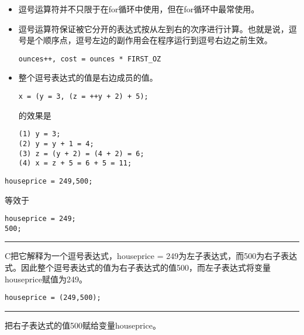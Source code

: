 \begin{frame}[fragile]\ft{\secname}
\begin{itemize}
\item
 逗号运算符并不只限于在for循环中使用，但在for循环中最常使用。
\end{itemize}
\end{frame}


\begin{frame}[fragile]\ft{\secname}
\begin{itemize}
\item
逗号运算符保证被它分开的表达式按从左到右的次序进行计算。也就是说，逗号是个顺序点，逗号左边的副作用会在程序运行到逗号右边之前生效。
\begin{lstlisting}
ounces++, cost = ounces * FIRST_OZ
\end{lstlisting}
\end{itemize}

\end{frame}

\begin{frame}[fragile]\ft{\secname}
\begin{itemize}
\item
整个逗号表达式的值是右边成员的值。
\begin{lstlisting}
x = (y = 3, (z = ++y + 2) + 5);
\end{lstlisting}
的效果是
\begin{lstlisting}
(1) y = 3;
(2) y = y + 1 = 4;
(3) z = (y + 2) = (4 + 2) = 6;
(4) x = z + 5 = 6 + 5 = 11;
\end{lstlisting}
\end{itemize}

\end{frame}

\begin{frame}[fragile]\ft{\secname}
\begin{lstlisting}
houseprice = 249,500;
\end{lstlisting}
等效于
\begin{lstlisting}
houseprice = 249;
500;
\end{lstlisting}
\rule{\textwidth}{1mm}\pause\vspace{0.1in}

C把它解释为一个逗号表达式，houseprice = 249为左子表达式，而500为右子表达式。因此整个逗号表达式的值为右子表达式的值500，而左子表达式将变量houseprice赋值为249。

\end{frame}

\begin{frame}[fragile]\ft{\secname}
\begin{lstlisting}
houseprice = (249,500);
\end{lstlisting}
\rule{\textwidth}{1mm}\pause\vspace{0.1in}

把右子表达式的值500赋给变量houseprice。
\end{frame}

